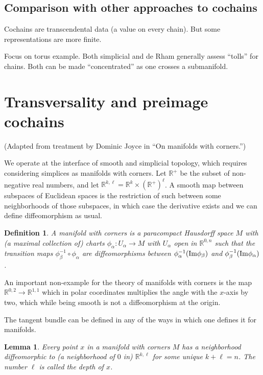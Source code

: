 \documentclass{amsart}          %
\newtheorem{lemma}[theorem]{Lemma}
\newtheorem{definition}[theorem]{Definition}
\newcommand{\R}{\mathbb R}
\begin{document}
\subsection{Comparison with other approaches to cochains}

Cochains are transcendental data (a value on every chain).  But some representations are more finite.

Focus on torus example.  Both simplicial and de Rham  generally assess ``tolls'' for chains.  Both can be made ``concentrated'' as one
crosses a submanifold.  


\section{Transversality and preimage cochains}

(Adapted from treatment by Dominic Joyce in ``On manifolds with corners.'')

We operate at the interface of smooth and simplicial topology, which requires considering simplices as manifolds with corners.
Let $\R^+$ be the subset of non-negative real numbers, and let $\R^{k,\ell} = \R^k \times (\R^+)^\ell$.  A smooth map between
 subspaces of Euclidean spaces is the restriction of such between some neighborhoods of those subspaces, in which case
 the derivative exists and we can define diffeomorphism as usual.

\begin{definition}
A manifold with corners is a paracompact Hausdorff space $M$ with (a maximal collection of) charts $\phi_\alpha : U_\alpha \to M$
with $U_\alpha$ open in  $\R^{0,n}$
such that the transition maps $\phi_\beta^{-1} \circ \phi_\alpha$ are diffeomorphisms between $\phi_\alpha^{-1} ({\rm Im} \phi_\beta)$
and $\phi_\beta^{-1} ({\rm Im} \phi_\alpha)$.  
\end{definition}

An important non-example for the theory of manifolds with corners is the map $\R^{0,2} \to \R^{1,1}$ 
which in polar coordinates multiplies the angle
with the $x$-axis by two, which while being smooth is not a diffeomorphism at the origin.

The tangent bundle can be defined in any of the ways in which one defines it for manifolds. 

\begin{lemma}
Every point $x$ in a manifold with corners $M$ 
has a neighborhood diffeomorphic to (a neighborhood of $0$ in) 
$\R^{k,\ell}$ for some unique $k + \ell = n$.  The number $\ell$
is called the depth of $x$.
\end{lemma}
\end{document}
